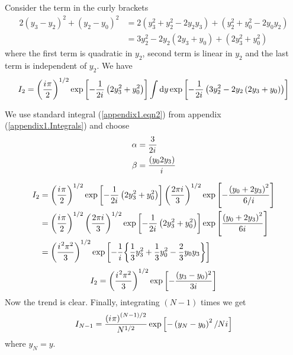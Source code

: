 	Consider the term in the curly brackets
	\begin{align*}
		2\left(y_3 - y_2\right)^2 + \left(y_2 - y_0\right)^2 &= 2\left(y_3^2 + y_2^2 - 2y_2 y_3\right) + \left(y_2^2 + y_0^2 - 2 y_0 y_2\right) \\
		&= 3 y_2^2 - 2y_2 \left(2y_3 + y_0\right) + \left(2 y_3^2 + y_0^2\right)
	\end{align*}
	where the first term is quadratic in $y_2$, second term is linear in $y_2$ and the last term is independent of $y_2$. We have
	\begin{equation}
		I_2 = \left(\frac{{i\mkern1mu} \pi}{2}\right)^{1/2} \exp\left[-\frac{1}{2{i\mkern1mu}}\left(2 y_3^2 + y_0^2\right)\right] \int \dd{y} \exp\left[-\frac{1}{2{i\mkern1mu}} \left(3 y_2^2 - 2y_2 \left(2 y_3 + y_0\right)\right) \right]
	\end{equation}
	
	We use standard integral (\ref{appendix1.eqn2}) from appendix (\ref{appendix1.Integrals}) and choose
	\begin{align}
		\alpha &= \frac{3}{2{i\mkern1mu}} \\
		\beta &= \frac{\left(y_0 2 y_3\right)}{{i\mkern1mu}}
	\end{align}
	
	\begin{align*}
		I_2 
		&= \left(\frac{{i\mkern1mu} \pi}{2}\right)^{1/2} \exp\left[-\frac{1}{2{i\mkern1mu}} \left(2 y_3^2 + y_0^2\right)\right] \left(\frac{2\pi {i\mkern1mu}}{3}\right)^{1/2} \exp\left[-\frac{\left(y_0 + 2 y_3\right)^2}{6/{i\mkern1mu}}\right] \\
		&= \left(\frac{{i\mkern1mu} \pi}{2}\right)^{1/2} \left(\frac{2\pi {i\mkern1mu}}{3}\right)^{1/2}  \exp\left[-\frac{1}{2{i\mkern1mu}} \left(2 y_3^2 + y_0^2\right)\right]  \exp\left[\frac{\left(y_0 + 2 y_3\right)^2}{6{i\mkern1mu}}\right] \\
		&= \qty(\frac{{i\mkern1mu}^2 \pi^2}{3})^{1/2} \exp\left[-\frac{1}{{i\mkern1mu}}\qty{\frac{1}{3} y_3^2 + \frac{1}{3} y_0^2 -\frac{2}{3} y_0 y_3}\right]
	\end{align*}
	\begin{equation}
		I_2 = \qty(\frac{{i\mkern1mu}^2 \pi^2}{3})^{1/2} \exp\left[-\frac{(y_3-y_0)^2}{3{i\mkern1mu}}\right]
		\label{chapter12.eqn17-path-integral-free-particle}
	\end{equation}
	Now the trend is clear. Finally, integrating $(N-1)$ times we get
	\begin{equation}
		I_{N-1} = \frac{\left({i\mkern1mu} \pi\right)^{(N-1)/2}}{N^{1/2}} \exp\left[-\left(y_N - y_0\right)^2/N{i\mkern1mu}
		\right]
	\end{equation}
	where $y_N = y$.\\


